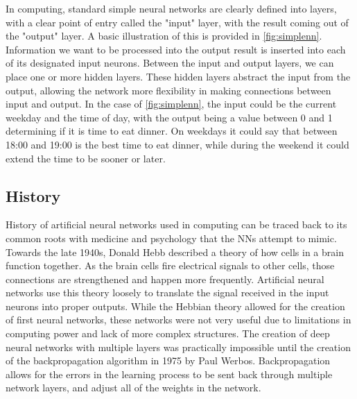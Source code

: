 In computing, standard simple neural networks are clearly defined into layers, with a clear point of entry called the "input" layer, with the result coming out of the "output" layer. 
A basic illustration of this is provided in \cref{fig:simplenn}. 
Information we want to be processed into the output result is inserted into each of its designated input neurons. 
Between the input and output layers, we can place one or more hidden layers.
These hidden layers abstract the input from the output, allowing the network more flexibility in making connections between input and output. 
In the case of \cref{fig:simplenn}, the input could be the current weekday and the time of day, with the output being a value between 0 and 1 determining if it is time to eat dinner. 
On weekdays it could say that between 18:00 and 19:00 is the best time to eat dinner, while during the weekend it could extend the time to be sooner or later.


\subsection{History}


History of artificial neural networks used in computing can be traced back to its common roots with medicine and psychology that the NNs attempt to mimic. 
Towards the late 1940s, Donald Hebb \cite{hebb2005organization} described a theory of how cells in a brain function together. 
As the brain cells fire electrical signals to other cells, those connections are strengthened and happen more frequently.
Artificial neural networks use this theory loosely to translate the signal received in the input neurons into proper outputs.
While the Hebbian theory allowed for the creation of first neural networks, these networks were not very useful due to limitations in computing power and lack of more complex structures. 
The creation of deep neural networks with multiple layers was practically impossible until the creation of the backpropagation algorithm in 1975 by Paul Werbos\cite{werbos1975beyond}. 
Backpropagation allows for the errors in the learning process to be sent back through multiple network layers, and adjust all of the weights in the network.


